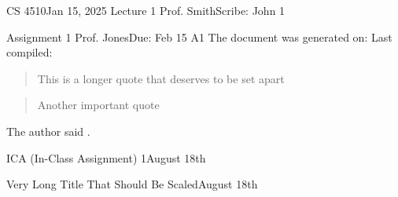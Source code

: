 \documentclass[11pt]{article}
\begin{document}
  \newpage\handout
  {CS 4510}{Jan 15, 2025}
  {Lecture 1}
  {Prof. Smith}{Scribe: John}
  {1}

  \newpage{}
  {Assignment 1}
  {Prof. Jones}{Due: Feb 15}
  {A1}
  The document was generated on: \generatedOn
  Last compiled: \generatedOn


  \blockquote{This is a longer quote that deserves to be set apart}
  \blockquote{Another important quote}
  The author said .
  

               {ICA (In-Class Assignment) 1}{August 18th}

                {Very Long Title That Should Be Scaled}{August 18th}


  
\end{document}
